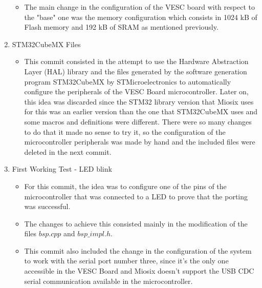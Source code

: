 \begin{enumerate}
\begin {itemize}
\begin {itemize}
					\item $bsp\_impl.h$
					\item $stm32\_256k+64k\_rom.ld$ later changed to $stm32\_1m+192k\_ram.ld$
					\item $stm32f405RGTx\_VESC\_4\_12.cfg$
					\item $board\_settings.h$
					\item $c\_standard\_headers\_indexer.c$
					\item $cpp\_standard\_headers\_indexer.cpp$
				\end {itemize}
			\item The main change in the configuration of the VESC board with respect to the "base" one was the memory configuration which consists in 1024 kB of Flash memory and 192 kB of SRAM as mentioned previously.
		\end {itemize}
	\item STM32CubeMX Files
		\begin {itemize}
			\item This commit consisted in the attempt to use the Hardware Abstraction Layer (HAL) library and the files generated by the software generation program STM32CubeMX by STMicroelectronics to automatically configure the peripherals of the VESC Board microcontroller. Later on, this idea was discarded since the STM32 library version that Miosix uses for this was an earlier version than the one that STM32CubeMX uses and some macros and definitions were different. There were so many changes to do that it made no sense to try it, so the configuration of the microcontroller peripherals was made by hand and the included files were deleted in the next commit.
		\end {itemize}
	\item First Working Test - LED blink
		\begin {itemize}
			\item For this commit, the idea was to configure one of the pins of the microcontroller that was connected to a LED to prove that the porting was successful.
			\item The changes to achieve this consisted mainly in the modification of the files $bsp.cpp$ and $bsp\_impl.h$.
			\item This commit also included the change in the configuration of the system to work with the serial port number three, since it's the only one accessible in the VESC Board and Miosix doesn't support the USB CDC serial communication available in the microcontroller.
		\end {itemize}

\end{enumerate}
